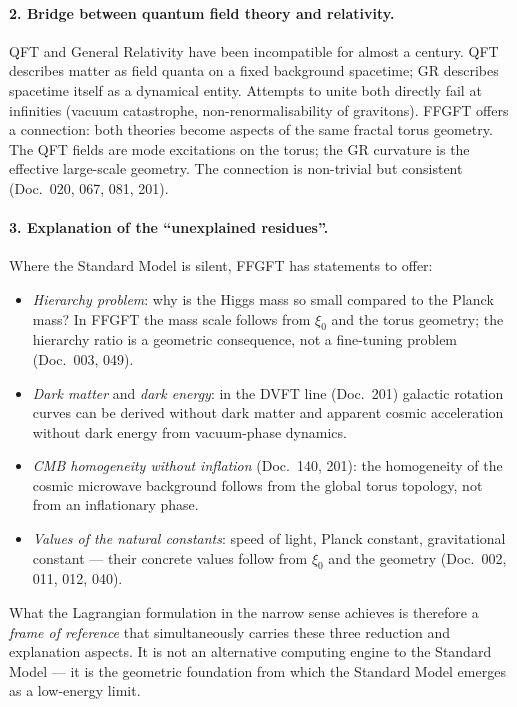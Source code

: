 \paragraph{2. Bridge between quantum field theory and relativity.}
QFT and General Relativity have been incompatible for almost a
century. QFT describes matter as field quanta on a fixed background
spacetime; GR describes spacetime itself as a dynamical entity.
Attempts to unite both directly fail at infinities (vacuum
catastrophe, non-renormalisability of gravitons). FFGFT offers a
connection: both theories become aspects of the same fractal torus
geometry. The QFT fields are mode excitations on the torus; the GR
curvature is the effective large-scale geometry. The connection is
non-trivial but consistent (Doc.~020, 067, 081, 201).

\paragraph{3. Explanation of the \enquote{unexplained residues}.}
Where the Standard Model is silent, FFGFT has statements to offer:
\begin{itemize}\setlength\itemsep{0pt}
  \item \emph{Hierarchy problem}: why is the Higgs mass so small
        compared to the Planck mass? In FFGFT the mass scale follows
        from $\xi_0$ and the torus geometry; the hierarchy ratio is
        a geometric consequence, not a fine-tuning problem
        (Doc.~003, 049).
  \item \emph{Dark matter} and \emph{dark energy}: in the DVFT line
        (Doc.~201) galactic rotation curves can be derived without
        dark matter and apparent cosmic acceleration without dark
        energy from vacuum-phase dynamics.
  \item \emph{CMB homogeneity without inflation} (Doc.~140, 201):
        the homogeneity of the cosmic microwave background follows
        from the global torus topology, not from an inflationary
        phase.
  \item \emph{Values of the natural constants}: speed of light,
        Planck constant, gravitational constant --- their concrete
        values follow from $\xi_0$ and the geometry (Doc.~002, 011,
        012, 040).
\end{itemize}

What the Lagrangian formulation in the narrow sense achieves is
therefore a \emph{frame of reference} that simultaneously carries
these three reduction and explanation aspects. It is not an
alternative computing engine to the Standard Model --- it is the
geometric foundation from which the Standard Model emerges as a
low-energy limit.

